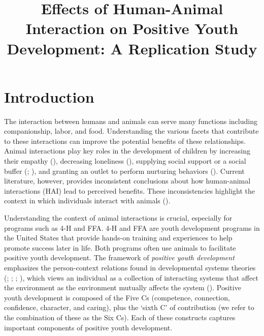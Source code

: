 \documentclass[
  jou,
  longtable,
  nolmodern,
  notxfonts,
  notimes,
  colorlinks=true,linkcolor=blue,citecolor=blue,urlcolor=blue]{apa7}
\title{Effects of Human-Animal Interaction on Positive Youth
Development: A Replication Study}
\begin{document}
\maketitle


\setcounter{secnumdepth}{-\maxdimen} %

\setlength\LTleft{0pt}


\section{Introduction}\label{introduction}

The interaction between humans and animals can serve many functions
including companionship, labor, and food. Understanding the various
facets that contribute to these interactions can improve the potential
benefits of these relationships. Animal interactions play key roles in
the development of children by increasing their empathy
(), decreasing
loneliness (),
supplying social support or a social buffer
(;
), and granting an outlet to
perform nurturing behaviors ().
Current literature, however, provides inconsistent conclusions about how
human-animal interactions (HAI) lead to perceived benefits. These
inconsistencies highlight the context in which individuals interact with
animals ().

Understanding the context of animal interactions is crucial, especially
for programs such as 4-H and FFA. 4-H and FFA are youth development
programs in the United States that provide hands-on training and
experiences to help promote success later in life. Both programs often
use animals to facilitate positive youth development. The framework of
\emph{positive youth development} emphasizes the person-context
relations found in developmental systems theories
(;
;
;
), which views an
individual as a collection of interacting systems that affect the
environment as the environment mutually affects the system
(). Positive youth development
is composed of the Five Cs (competence, connection, confidence,
character, and caring), plus the `sixth C' of contribution (we refer to
the combination of these as the Six Cs). Each of these constructs
captures important components of positive youth development.
\end{document}
